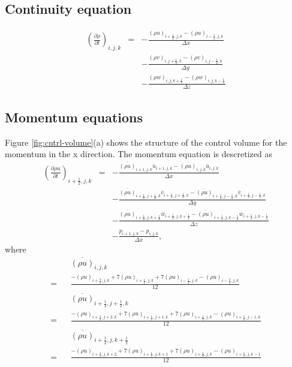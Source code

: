 \subsection{Continuity equation}
\begin{eqnarray}
\left(\frac{\partial \rho}{\partial t}\right)_{i,j,k}
&=& - \frac{(\rho u)_{i+\frac{1}{2},j,k} -(\rho u)_{i-\frac{1}{2},j,k}}{\Delta x}\nonumber\\
& & - \frac{(\rho v)_{i,j+\frac{1}{2},k} -(\rho v)_{i,j-\frac{1}{2},k}}{\Delta y}\nonumber\\
& & - \frac{(\rho w)_{i,j,k+\frac{1}{2}} -(\rho w)_{i,j,k-\frac{1}{2}}}{\Delta z}
\end{eqnarray}

\subsection{Momentum equations}
Figure \ref{fig:cntrl-volume}(a) shows the structure of the control volume for the momentum
in the x direction.
The momentum equation is descretized as
\begin{eqnarray}
\left(\frac{\partial \rho u}{\partial t}\right)_{i+\frac{1}{2},j,k}
&=& - \frac{\overline{(\rho u)}_{i+1,j,k} \overline{u}_{i+1,j,k}
           -\overline{(\rho u)}_{i,j,k} \overline{u}_{i,j,k}}
     {\Delta x}\nonumber\\
& & - \frac{\overline{(\rho u)}_{i+\frac{1}{2},j+\frac{1}{2},k}  \overline{v}_{i+\frac{1}{2},j+\frac{1}{2},k}
           -\overline{(\rho u)}_{i+\frac{1}{2},j-\frac{1}{2},k}  \overline{v}_{i+\frac{1}{2},j-\frac{1}{2},k}}
     {\Delta y}\nonumber\\
& & - \frac{\overline{(\rho u)}_{i+\frac{1}{2},j,k+\frac{1}{2}}  \overline{w}_{i+\frac{1}{2},j,k+\frac{1}{2}}
           -\overline{(\rho u)}_{i+\frac{1}{2},j,k-\frac{1}{2}}  \overline{w}_{i+\frac{1}{2},j,k-\frac{1}{2}}}
     {\Delta z}\nonumber\\
& & -\frac{p_{i+1,j,k}-p_{i,j,k}}{\Delta x},
\end{eqnarray}
where
\begin{eqnarray}
&& \overline{(\rho u)}_{i,j,k} \nonumber\\
= && \frac{-(\rho u)_{i+\frac{3}{2},j,k}+7(\rho u)_{i+\frac{1}{2},j,k}+7(\rho u)_{i-\frac{1}{2},j,k}-(\rho u)_{i-\frac{3}{2},j,k}}{12}\\
&& \overline{(\rho u)}_{i+\frac{1}{2},j+\frac{1}{2},k} \nonumber\\
= && \frac{-(\rho u)_{i+\frac{1}{2},j+2,k}+7(\rho u)_{i+\frac{1}{2},j+1,k}+7(\rho u)_{i+\frac{1}{2},j,k}-(\rho u)_{i+\frac{1}{2},j-1,k}}{12}\\
&& \overline{(\rho u)}_{i+\frac{1}{2},j,k+\frac{1}{2}} \nonumber\\
= &&\frac{-(\rho u)_{i+\frac{1}{2},j,k+2}+7(\rho u)_{i+\frac{1}{2},j,k+1}+7(\rho u)_{i+\frac{1}{2},j,k}-(\rho u)_{i+\frac{1}{2},j,k-1}}{12}
\end{eqnarray}
